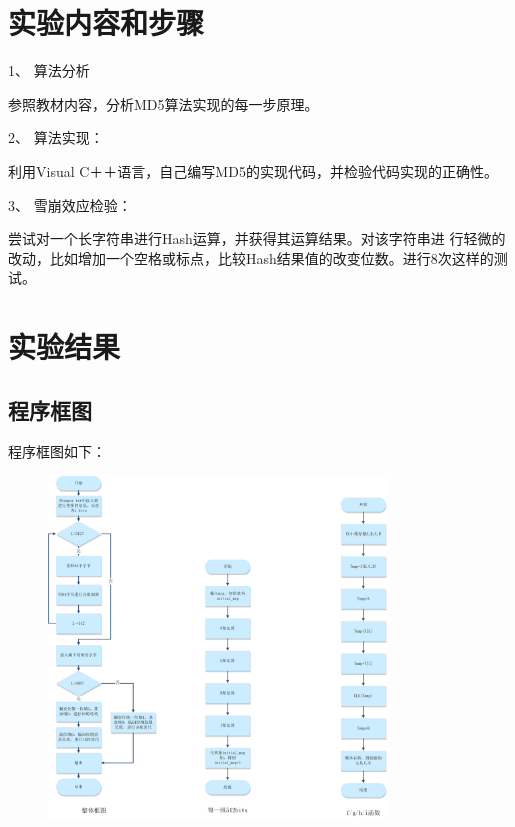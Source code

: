 \documentclass[UTF8,a4paper]{article}
\begin{document}
	\section{实验内容和步骤}
1、	算法分析\par 
参照教材内容，分析MD5算法实现的每一步原理。\par 
2、	算法实现：\par 
利用Visual C＋＋语言，自己编写MD5的实现代码，并检验代码实现的正确性。\par 
3、	雪崩效应检验：\par 
尝试对一个长字符串进行Hash运算，并获得其运算结果。对该字符串进
行轻微的改动，比如增加一个空格或标点，比较Hash结果值的改变位数。进行8次这样的测试。\par 
 



	\section{实验结果}
	\subsection{程序框图}
	程序框图如下：\par \newpage
	\begin{figure}[!ht]
		
		\centering
		\includegraphics[width=0.8\textwidth]{liucheng.PNG}
	
		\label{fig:p3}
	\end{figure}
	
\end{document}
